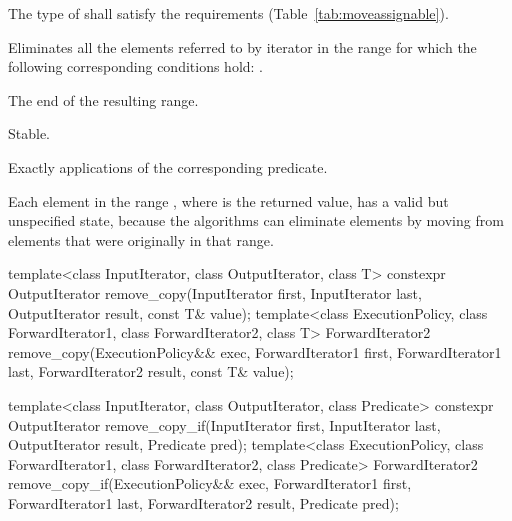 \begin{itemdescr}
\pnum
\requires
The type of
shall satisfy the 
requirements (Table~\ref{tab:moveassignable}).

\pnum
\effects
Eliminates all the elements referred to by iterator
in the range 
for which the following corresponding conditions hold:
.

\pnum
\returns
The end of the resulting range.

\pnum
\remarks Stable.

\pnum
\complexity
Exactly
applications of the corresponding predicate.

\pnum
\begin{note}
Each element in the range , where  is
the returned value, has a valid but unspecified state, because the algorithms
can eliminate elements by moving from elements that were originally
in that range.
\end{note}
\end{itemdescr}

%
%
\begin{itemdecl}
template<class InputIterator, class OutputIterator, class T>
  constexpr OutputIterator
    remove_copy(InputIterator first, InputIterator last,
                OutputIterator result, const T& value);
template<class ExecutionPolicy, class ForwardIterator1, class ForwardIterator2,
         class T>
  ForwardIterator2
    remove_copy(ExecutionPolicy&& exec,
                ForwardIterator1 first, ForwardIterator1 last,
                ForwardIterator2 result, const T& value);

template<class InputIterator, class OutputIterator, class Predicate>
  constexpr OutputIterator
    remove_copy_if(InputIterator first, InputIterator last,
                   OutputIterator result, Predicate pred);
template<class ExecutionPolicy, class ForwardIterator1, class ForwardIterator2,
         class Predicate>
  ForwardIterator2
    remove_copy_if(ExecutionPolicy&& exec,
                   ForwardIterator1 first, ForwardIterator1 last,
                   ForwardIterator2 result, Predicate pred);
\end{itemdecl}

